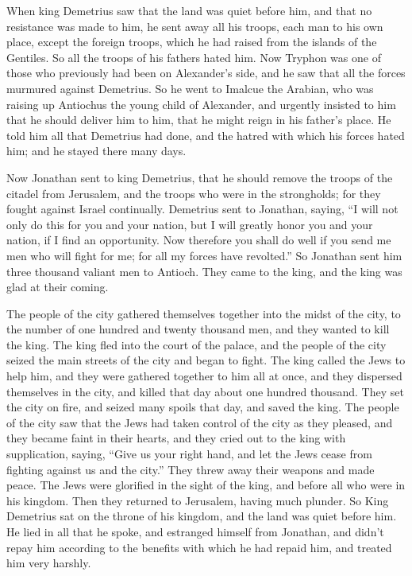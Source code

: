  When king Demetrius saw that the land was quiet before
him, and that no resistance was made to him, he sent away all his
troops, each man to his own place, except the foreign troops, which he
had raised from the islands of the Gentiles. So all the troops of his
fathers hated him.  Now Tryphon was one of those who
previously had been on Alexander's side, and he saw that all the forces
murmured against Demetrius. So he went to Imalcue the Arabian, who was
raising up Antiochus the young child of Alexander,  and
urgently insisted to him that he should deliver him to him, that he
might reign in his father's place. He told him all that Demetrius had
done, and the hatred with which his forces hated him; and he stayed
there many days.

 Now Jonathan sent to king Demetrius, that he should remove
the troops of the citadel from Jerusalem, and the troops who were in the
strongholds; for they fought against Israel continually. 
Demetrius sent to Jonathan, saying, ``I will not only do this for you
and your nation, but I will greatly honor you and your nation, if I find
an opportunity.  Now therefore you shall do well if you
send me men who will fight for me; for all my forces have revolted.''
 So Jonathan sent him three thousand valiant men to
Antioch. They came to the king, and the king was glad at their coming.

 The people of the city gathered themselves together into
the midst of the city, to the number of one hundred and twenty thousand
men, and they wanted to kill the king.  The king fled into
the court of the palace, and the people of the city seized the main
streets of the city and began to fight.  The king called
the Jews to help him, and they were gathered together to him all at
once, and they dispersed themselves in the city, and killed that day
about one hundred thousand.  They set the city on fire, and
seized many spoils that day, and saved the king.  The
people of the city saw that the Jews had taken control of the city as
they pleased, and they became faint in their hearts, and they cried out
to the king with supplication, saying,  ``Give us your
right hand, and let the Jews cease from fighting against us and the
city.''  They threw away their weapons and made peace. The
Jews were glorified in the sight of the king, and before all who were in
his kingdom. Then they returned to Jerusalem, having much plunder.
 So King Demetrius sat on the throne of his kingdom, and
the land was quiet before him.  He lied in all that he
spoke, and estranged himself from Jonathan, and didn't repay him
according to the benefits with which he had repaid him, and treated him
very harshly.

